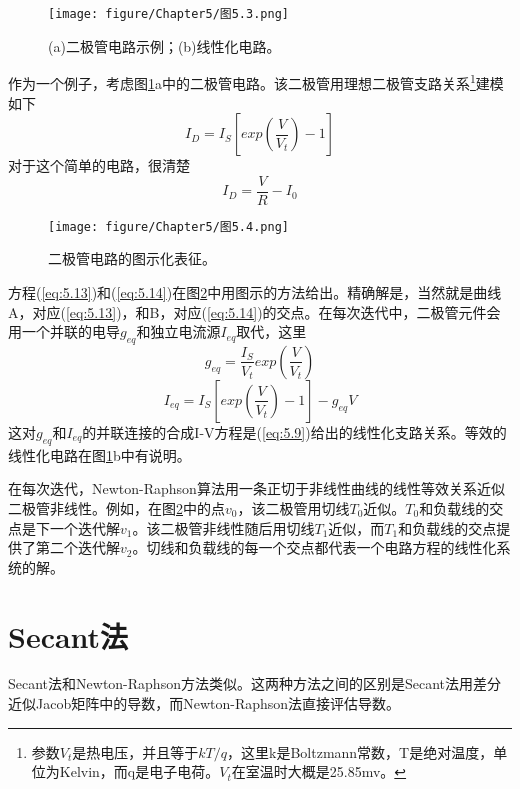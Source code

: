 \begin{figure}[htbp]
\small
    \centering
    \texttt{[image: figure/Chapter5/图5.3.png]}
    \caption{(a)二极管电路示例；(b)线性化电路。}
    \label{图5.3}
\end{figure}
作为一个例子，考虑图\ref{图5.3}a中的二极管电路。该二极管用理想二极管支路关系\footnote{参数$V_t$是热电压，并且等于$kT/q$，这里k是Boltzmann常数，T是绝对温度，单位为Kelvin，而q是电子电荷。$V_t$在室温时大概是25.85mv。}建模如下
\begin{equation}
    I_D = I_S[exp(\frac{V}{V_t})-1]
    \label{eq:5.13}
\end{equation}
对于这个简单的电路，很清楚
\begin{equation}
    I_D = \frac{V}{R} - I_0
    \label{eq:5.14}
\end{equation}

\begin{figure}[htbp]
\small
    \centering
    \texttt{[image: figure/Chapter5/图5.4.png]}
    \caption{二极管电路的图示化表征。}
    \label{图5.4}
\end{figure}

方程(\ref{eq:5.13})和(\ref{eq:5.14})在图\ref{图5.4}中用图示的方法给出。精确解是，当然就是曲线A，对应(\ref{eq:5.13})，和B，对应(\ref{eq:5.14})的交点。在每次迭代中，二极管元件会用一个并联的电导$g_{eq}$和独立电流源$I_{eq}$取代，这里
\begin{equation}
    g_{eq} = \frac{I_S}{V_t}exp(\frac{V}{V_t})
    \label{eq:5.15}
\end{equation}
\begin{equation}
    I_{eq} = I_S[exp(\frac{V}{V_t})-1]-g_{eq}V
    \label{eq:5.16}
\end{equation}
这对$g_{eq}$和$I_{eq}$的并联连接的合成I-V方程是(\ref{eq:5.9})给出的线性化支路关系。等效的线性化电路在图\ref{图5.3}b中有说明。

在每次迭代，Newton-Raphson算法用一条正切于非线性曲线的线性等效关系近似二极管非线性。例如，在图\ref{图5.4}中的点$v_0$，该二极管用切线$T_0$近似。$T_0$和负载线的交点是下一个迭代解$v_1$。该二极管非线性随后用切线$T_1$近似，而$T_1$和负载线的交点提供了第二个迭代解$v_2$。切线和负载线的每一个交点都代表一个电路方程的线性化系统的解。

\section{Secant法}
Secant法和Newton-Raphson方法类似。这两种方法之间的区别是Secant法用差分近似Jacob矩阵中的导数，而Newton-Raphson法直接评估导数。

